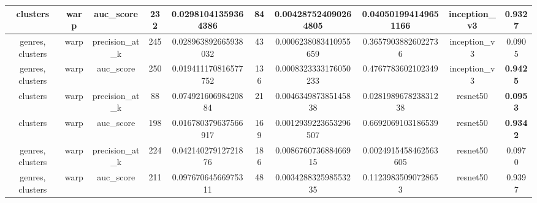\begin{table}
{\begin{tabular}{|c|c|c|c|c|c|c|c|c|c|}
\hline
clusters                            & warp                            & auc\_score                          & 232             & 0.02981041359364386    & 84                     & 0.004287524090264805  & 0.040501994149651166  & inception\_v3                    & 0.9327                              \\ 
\hline
genres, clusters                    & warp                            & precision\_at\_k                    & 245             & 0.028963892665938032   & 43                     & 0.0006238083410955659 & 0.36579038826022736   & inception\_v3                    & 0.0905                              \\ 
\hline
genres, clusters                    & warp                            & auc\_score                          & 250             & 0.019411170816577752   & 136                    & 0.0008323333176050233 & 0.4767783602102349    & inception\_v3                    & \textbf{0.9425}                              \\ 
\hline
clusters                            & warp                            & precision\_at\_k                    & 88              & 0.07492160698420884    & 21                     & 0.004634987385145838  & 0.028198967823831238  & resnet50                         & \textbf{0.0953}                              \\ 
\hline
clusters                            & warp                            & auc\_score                          & 198             & 0.016780379637566917   & 169                    & 0.0012939223653296507 & 0.6692069103186539    & resnet50                         & \textbf{0.9342}                              \\ 
\hline
genres, clusters                    & warp                            & precision\_at\_k                    & 224             & 0.04214027912721876    & 186                    & 0.008676073688466915  & 0.0024915458462563605 & resnet50                         & 0.0970                              \\ 
\hline
genres, clusters                    & warp                            & auc\_score                          & 211             & 0.09767064566975311    & 48                     & 0.003428832598553235  & 0.11239835090728653   & resnet50                         & 0.9397                              \\
\hline
\end{tabular}}
\end{table}